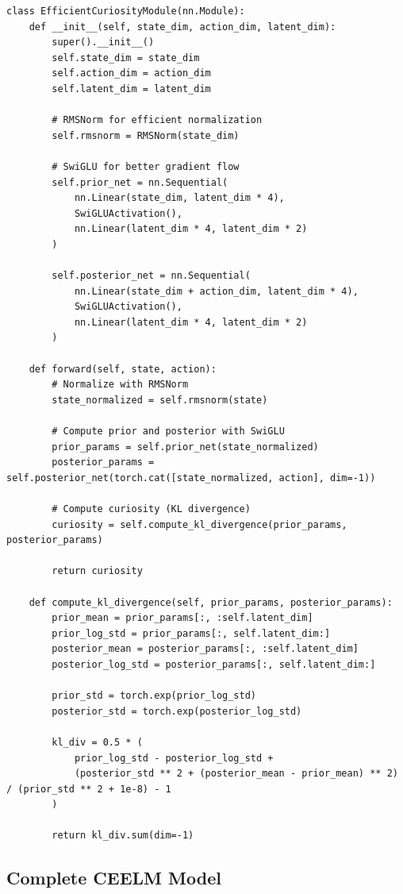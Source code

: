 \documentclass{IEEEtran}
\begin{document}
\begin{verbatim}
class EfficientCuriosityModule(nn.Module):
    def __init__(self, state_dim, action_dim, latent_dim):
        super().__init__()
        self.state_dim = state_dim
        self.action_dim = action_dim
        self.latent_dim = latent_dim
        
        # RMSNorm for efficient normalization
        self.rmsnorm = RMSNorm(state_dim)
        
        # SwiGLU for better gradient flow
        self.prior_net = nn.Sequential(
            nn.Linear(state_dim, latent_dim * 4),
            SwiGLUActivation(),
            nn.Linear(latent_dim * 4, latent_dim * 2)
        )
        
        self.posterior_net = nn.Sequential(
            nn.Linear(state_dim + action_dim, latent_dim * 4),
            SwiGLUActivation(),
            nn.Linear(latent_dim * 4, latent_dim * 2)
        )
    
    def forward(self, state, action):
        # Normalize with RMSNorm
        state_normalized = self.rmsnorm(state)
        
        # Compute prior and posterior with SwiGLU
        prior_params = self.prior_net(state_normalized)
        posterior_params = self.posterior_net(torch.cat([state_normalized, action], dim=-1))
        
        # Compute curiosity (KL divergence)
        curiosity = self.compute_kl_divergence(prior_params, posterior_params)
        
        return curiosity
    
    def compute_kl_divergence(self, prior_params, posterior_params):
        prior_mean = prior_params[:, :self.latent_dim]
        prior_log_std = prior_params[:, self.latent_dim:]
        posterior_mean = posterior_params[:, :self.latent_dim]
        posterior_log_std = posterior_params[:, self.latent_dim:]
        
        prior_std = torch.exp(prior_log_std)
        posterior_std = torch.exp(posterior_log_std)
        
        kl_div = 0.5 * (
            prior_log_std - posterior_log_std +
            (posterior_std ** 2 + (posterior_mean - prior_mean) ** 2) / (prior_std ** 2 + 1e-8) - 1
        )
        
        return kl_div.sum(dim=-1)
\end{verbatim}

\subsection{Complete CEELM Model}
\end{document}
